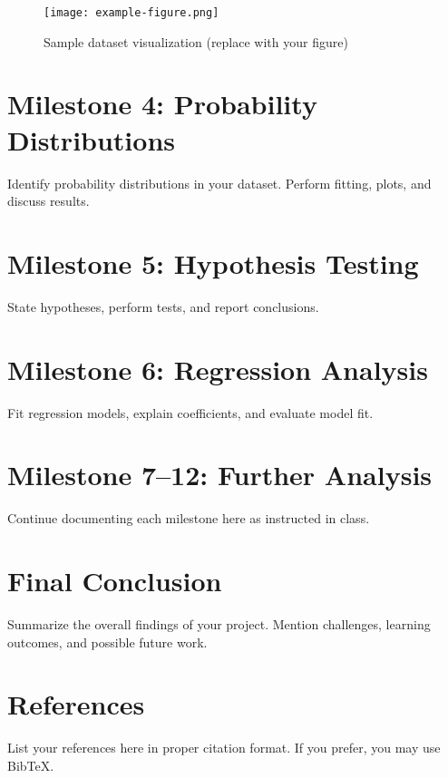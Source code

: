 \documentclass[12pt,a4paper]{article}
\begin{document}
\begin{figure}[h!]
\centering
\texttt{[image: example-figure.png]}
\caption{Sample dataset visualization (replace with your figure)}
\end{figure}





















\newpage
\section{Milestone 4: Probability Distributions}
Identify probability distributions in your dataset. Perform fitting, plots, and discuss results.

\section{Milestone 5: Hypothesis Testing}
State hypotheses, perform tests, and report conclusions.

\section{Milestone 6: Regression Analysis}
Fit regression models, explain coefficients, and evaluate model fit.

\section{Milestone 7--12: Further Analysis}
Continue documenting each milestone here as instructed in class.

\section{Final Conclusion}
Summarize the overall findings of your project. Mention challenges, learning outcomes, and possible future work.

\newpage
\section*{References}
List your references here in proper citation format. If you prefer, you may use BibTeX.
\end{document}
